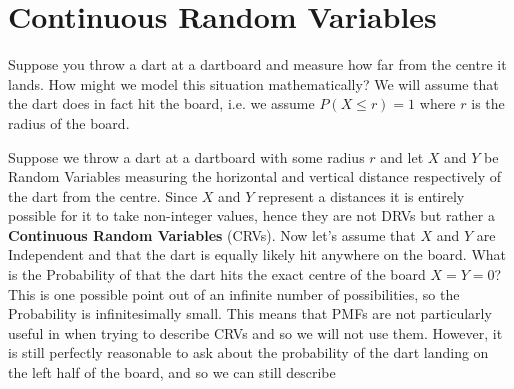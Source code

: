 \section{Continuous Random Variables}
Suppose you throw a dart at a dartboard and measure how far from the centre it lands. How might we model this situation mathematically? We will assume that the dart does in fact hit the board, i.e. we assume $P(X\le r)=1$ where $r$ is the radius of the board.




Suppose we throw a dart at a dartboard with some radius $r$ and let $X$ and $Y$ be Random Variables measuring the horizontal and vertical distance respectively of the dart from the centre. Since $X$ and $Y$ represent a distances it is entirely possible for it to take non-integer values, hence they are not DRVs but rather a \textbf{Continuous Random Variables} (CRVs). Now let's assume that $X$ and $Y$ are Independent and that the dart is equally likely hit anywhere on the board. What is the Probability of that the dart hits the exact centre of the board $X=Y=0$? This is one possible point out of an infinite number of possibilities, so the Probability is infinitesimally small. This means that PMFs are not particularly useful in when trying to describe CRVs and so we will not use them. However, it is still perfectly reasonable to ask about the probability of the dart landing on the left half of the board, and so we can still describe 








